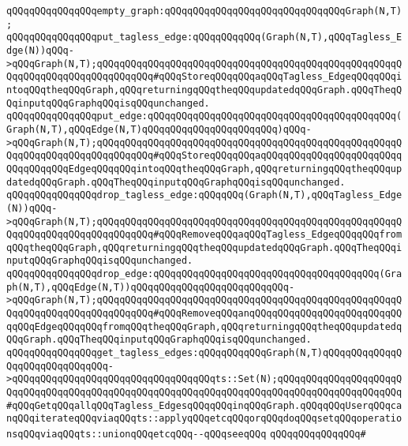 \newline
\verb|qQQqqQQqqQQqqQQqempty_graph:qQQqqQQqqQQqqQQqqQQqqQQqqQQqqQQqGraph(N,T);|\newline
\newline
\verb|qQQqqQQqqQQqqQQqput_tagless_edge:qQQqqQQqqQQq(Graph(N,T),qQQqTagless_Edge(N))qQQq->qQQqGraph(N,T);qQQqqQQqqQQqqQQqqQQqqQQqqQQqqQQqqQQqqQQqqQQqqQQqqQQqqQQqqQQqqQQqqQQqqQQqqQQqqQQq#qQQqStoreqQQqqQQqaqQQqTagless_EdgeqQQqqQQqintoqQQqtheqQQqGraph,qQQqreturningqQQqtheqQQqupdatedqQQqGraph.qQQqTheqQQqinputqQQqGraphqQQqisqQQqunchanged.|\newline
\verb|qQQqqQQqqQQqqQQqput_edge:qQQqqQQqqQQqqQQqqQQqqQQqqQQqqQQqqQQqqQQqqQQq(Graph(N,T),qQQqEdge(N,T)qQQqqQQqqQQqqQQqqQQqqQQq)qQQq->qQQqGraph(N,T);qQQqqQQqqQQqqQQqqQQqqQQqqQQqqQQqqQQqqQQqqQQqqQQqqQQqqQQqqQQqqQQqqQQqqQQqqQQqqQQq#qQQqStoreqQQqqQQqaqQQqqQQqqQQqqQQqqQQqqQQqqQQqqQQqqQQqEdgeqQQqqQQqintoqQQqtheqQQqGraph,qQQqreturningqQQqtheqQQqupdatedqQQqGraph.qQQqTheqQQqinputqQQqGraphqQQqisqQQqunchanged.|\newline
\newline
\verb|qQQqqQQqqQQqqQQqdrop_tagless_edge:qQQqqQQq(Graph(N,T),qQQqTagless_Edge(N))qQQq->qQQqGraph(N,T);qQQqqQQqqQQqqQQqqQQqqQQqqQQqqQQqqQQqqQQqqQQqqQQqqQQqqQQqqQQqqQQqqQQqqQQqqQQqqQQq#qQQqRemoveqQQqaqQQqTagless_EdgeqQQqqQQqfromqQQqtheqQQqGraph,qQQqreturningqQQqtheqQQqupdatedqQQqGraph.qQQqTheqQQqinputqQQqGraphqQQqisqQQqunchanged.|\newline
\verb|qQQqqQQqqQQqqQQqdrop_edge:qQQqqQQqqQQqqQQqqQQqqQQqqQQqqQQqqQQqqQQq(Graph(N,T),qQQqEdge(N,T))qQQqqQQqqQQqqQQqqQQqqQQqqQQq->qQQqGraph(N,T);qQQqqQQqqQQqqQQqqQQqqQQqqQQqqQQqqQQqqQQqqQQqqQQqqQQqqQQqqQQqqQQqqQQqqQQqqQQqqQQq#qQQqRemoveqQQqanqQQqqQQqqQQqqQQqqQQqqQQqqQQqqQQqEdgeqQQqqQQqfromqQQqtheqQQqGraph,qQQqreturningqQQqtheqQQqupdatedqQQqGraph.qQQqTheqQQqinputqQQqGraphqQQqisqQQqunchanged.|\newline
\newline
\newline
\verb|qQQqqQQqqQQqqQQqget_tagless_edges:qQQqqQQqqQQqGraph(N,T)qQQqqQQqqQQqqQQqqQQqqQQqqQQqqQQq->qQQqqQQqqQQqqQQqqQQqqQQqqQQqqQQqqQQqts::Set(N);qQQqqQQqqQQqqQQqqQQqqQQqqQQqqQQqqQQqqQQqqQQqqQQqqQQqqQQqqQQqqQQqqQQqqQQqqQQqqQQqqQQqqQQqqQQq#qQQqGetqQQqallqQQqTagless_EdgesqQQqqQQqinqQQqGraph.qQQqqQQqUserqQQqcanqQQqiterateqQQqviaqQQqts::applyqQQqetcqQQqorqQQqdoqQQqsetqQQqoperationsqQQqviaqQQqts::unionqQQqetcqQQq--qQQqseeqQQq|\newline
\verb|qQQqqQQqqQQqqQQq#|\newline
